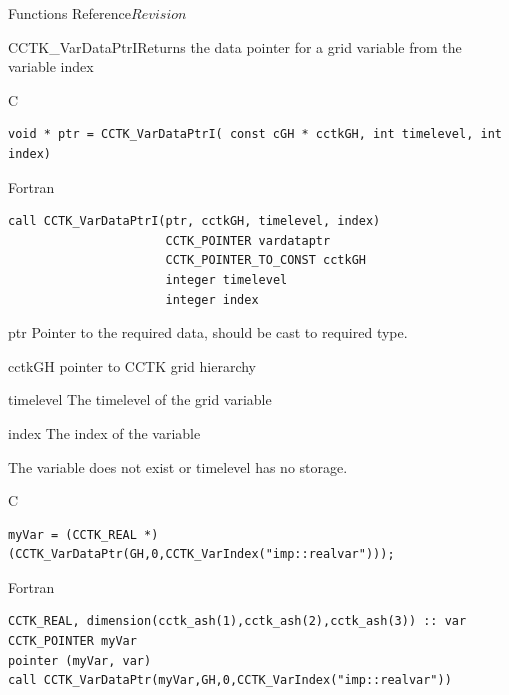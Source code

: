 \begin{cactuspart}{ Functions Reference}{}{$Revision$}
\begin{FunctionDescription}{CCTK\_VarDataPtrI}{Returns the data pointer for a grid variable from the variable index}
\label{CCTK-VarDataPtrI}
\begin{SynopsisSection}
\begin{Synopsis}{C}
\begin{verbatim}void * ptr = CCTK_VarDataPtrI( const cGH * cctkGH, int timelevel, int index)\end{verbatim}
\end{Synopsis}
\begin{Synopsis}{Fortran}
\begin{verbatim}
call CCTK_VarDataPtrI(ptr, cctkGH, timelevel, index)
                      CCTK_POINTER vardataptr
                      CCTK_POINTER_TO_CONST cctkGH
                      integer timelevel
                      integer index
\end{verbatim}
\end{Synopsis}
\end{SynopsisSection}
\begin{ResultSection}
\begin{Result}{ptr}
Pointer to the required data, should be cast to required type.
\end{Result}
\end{ResultSection}
\begin{ParameterSection}
\begin{Parameter}{cctkGH}
pointer to CCTK grid hierarchy
\end{Parameter}
\begin{Parameter}{timelevel}
The timelevel of the grid variable
\end{Parameter}
\begin{Parameter}{index}
The index of the variable
\end{Parameter}
\end{ParameterSection}
\begin{ErrorSection}
\begin{Error}{}
The variable does not exist or timelevel has no storage.
\end{Error}
\end{ErrorSection}

\begin{ExampleSection}
\begin{Example}{C}
\begin{verbatim}
myVar = (CCTK_REAL *)(CCTK_VarDataPtr(GH,0,CCTK_VarIndex("imp::realvar")));
\end{verbatim}
\end{Example}
\begin{Example}{Fortran}
\begin{verbatim}
CCTK_REAL, dimension(cctk_ash(1),cctk_ash(2),cctk_ash(3)) :: var
CCTK_POINTER myVar
pointer (myVar, var)
call CCTK_VarDataPtr(myVar,GH,0,CCTK_VarIndex("imp::realvar"))
\end{verbatim}
\end{Example}
\end{ExampleSection}
\end{FunctionDescription}



\end{cactuspart}
